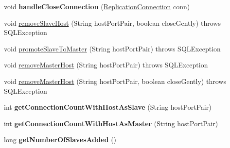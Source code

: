 \begin{DoxyCompactItemize}
\item 
\mbox{\label{classcom_1_1mysql_1_1jdbc_1_1_replication_connection_group_a50b39c4a15948ad6f72c01c9f6517a0e}} 
void {\bfseries handle\+Close\+Connection} (\mbox{\hyperlink{interfacecom_1_1mysql_1_1jdbc_1_1_replication_connection}{Replication\+Connection}} conn)
\item 
void \mbox{\hyperlink{classcom_1_1mysql_1_1jdbc_1_1_replication_connection_group_a0edd408afd3be5821bae63d00bdef097}{remove\+Slave\+Host}} (String host\+Port\+Pair, boolean close\+Gently)  throws S\+Q\+L\+Exception 
\item 
void \mbox{\hyperlink{classcom_1_1mysql_1_1jdbc_1_1_replication_connection_group_a140b14f491bedc6744398fa71dc3519a}{promote\+Slave\+To\+Master}} (String host\+Port\+Pair)  throws S\+Q\+L\+Exception 
\item 
void \mbox{\hyperlink{classcom_1_1mysql_1_1jdbc_1_1_replication_connection_group_a02f65bcb4a871155ab5ebdd0b58f865b}{remove\+Master\+Host}} (String host\+Port\+Pair)  throws S\+Q\+L\+Exception 
\item 
void \mbox{\hyperlink{classcom_1_1mysql_1_1jdbc_1_1_replication_connection_group_a8a270e9cbf9895c73694f7ed565ee4e7}{remove\+Master\+Host}} (String host\+Port\+Pair, boolean close\+Gently)  throws S\+Q\+L\+Exception 
\item 
\mbox{\label{classcom_1_1mysql_1_1jdbc_1_1_replication_connection_group_aab89e53ef91ba53400dd9000e921c10a}} 
int {\bfseries get\+Connection\+Count\+With\+Host\+As\+Slave} (String host\+Port\+Pair)
\item 
\mbox{\label{classcom_1_1mysql_1_1jdbc_1_1_replication_connection_group_aadb84cb7b2ca7f069e81d915a19bd34c}} 
int {\bfseries get\+Connection\+Count\+With\+Host\+As\+Master} (String host\+Port\+Pair)
\item 
\mbox{\label{classcom_1_1mysql_1_1jdbc_1_1_replication_connection_group_a196905b85143562fb21eac90461c2a11}} 
long {\bfseries get\+Number\+Of\+Slaves\+Added} ()
\item 
\mbox{\label{classcom_1_1mysql_1_1jdbc_1_1_replication_connection_group_a9a0beacc833023e904d1989b3088fe6c}} 

\end{DoxyCompactItemize}
